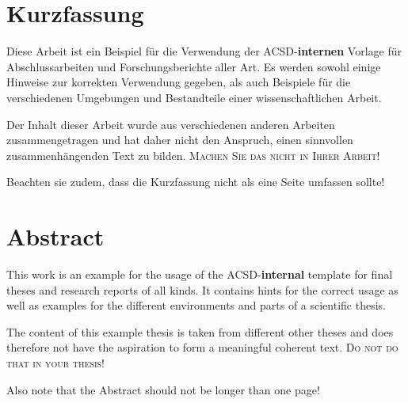 \setcounter{page}{1}
\chapter*{\bfseries Kurzfassung} %

Diese Arbeit ist ein Beispiel für die Verwendung der ACSD-\textbf{internen} Vorlage für Abschlussarbeiten und Forschungsberichte aller Art. Es werden sowohl einige Hinweise zur korrekten Verwendung gegeben, als auch Beispiele f{\"u}r die verschiedenen Umgebungen und Bestandteile einer wissenschaftlichen Arbeit.

Der Inhalt dieser Arbeit wurde aus verschiedenen anderen Arbeiten zusammengetragen und hat daher nicht den Anspruch, einen sinnvollen zusammenh{\"a}ngenden Text zu bilden. \textsc{Machen Sie das nicht in Ihrer Arbeit!}

Beachten sie zudem, dass die Kurzfassung nicht als eine Seite umfassen sollte!

\cleardoublepage

\chapter*{\bfseries Abstract} %

This work is an example for the usage of the ACSD-\textbf{internal} template for final theses and research reports of all kinds. It contains hints for the correct usage as well as examples for the different environments and parts of a scientific thesis. 

The content of this example thesis is taken from different other theses and does therefore not have the aspiration to form a meaningful coherent text. \textsc{Do not do that in your thesis!}

Also note that the Abstract should not be longer than one page!

\cleardoublepage
